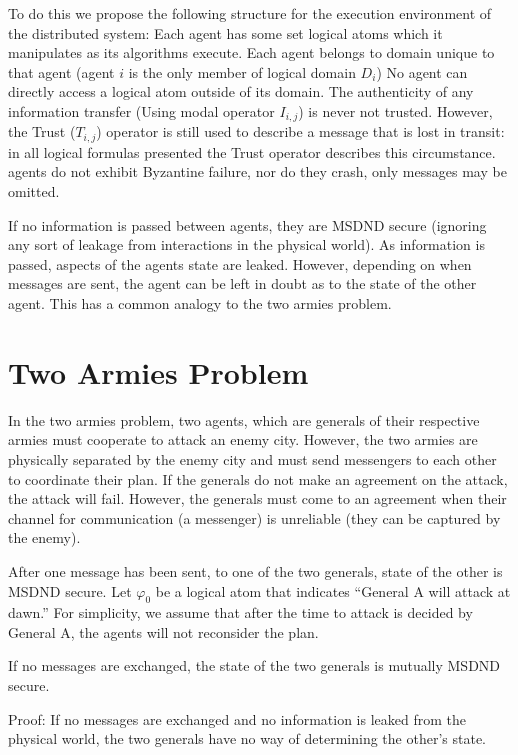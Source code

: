 To do this we propose the following structure for the execution environment of the distributed system:
Each agent has some set logical atoms which it manipulates as its algorithms execute.
Each agent belongs to domain unique to that agent (agent $i$ is the only member of logical domain $D_i$)
No agent can directly access a logical atom outside of its domain.
The authenticity of any information transfer (Using modal operator $I_{i,j}$) is never not trusted. However, the Trust ($T_{i,j}$) operator is still used to describe a message that is lost in transit: in all logical formulas presented the Trust operator describes this circumstance.
agents do not exhibit Byzantine failure, nor do they crash, only messages may be omitted.

If no information is passed between agents, they are MSDND secure (ignoring any sort of leakage from interactions in the physical world). As information is passed, aspects of the agents state are leaked. However, depending on when messages are sent, the agent can be left in doubt as to the state of the other agent. This has a common analogy to the two armies problem. 

\section{Two Armies Problem}

In the two armies problem, two agents, which are generals of their respective armies must cooperate to attack an enemy city. However, the two armies are physically separated by the enemy city and must send messengers to each other to coordinate their plan. If the generals do not make an agreement on the attack, the attack will fail. However, the generals must come to an agreement when their channel for communication (a messenger) is unreliable (they can be captured by the enemy).

After one message has been sent, to one of the two generals, state of the other is MSDND secure. Let $\varphi_0$ be a logical atom that indicates ``General A will attack at dawn.'' For simplicity, we assume that after the time to attack is decided by General A, the agents will not reconsider the plan.

\begin{thm}
If no messages are exchanged, the state of the two generals is mutually MSDND secure. \label{thm:nomsg}
\end{thm}

Proof: If no messages are exchanged and no information is leaked from the physical world, the two generals have no way of determining the other's state.


